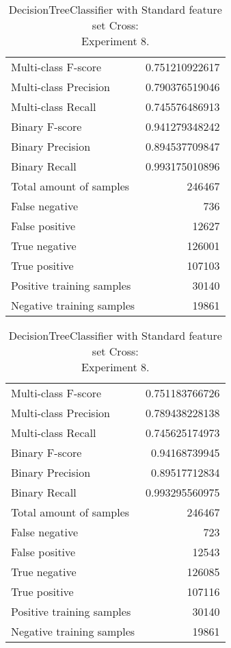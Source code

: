 \begin{table}[H]
\begin{minipage}{0.5\textwidth}
\caption{DecisionTreeClassifier with Standard feature set Cross: \\Experiment 7.}
\centering
\begin{tabular}{l r}
\toprule
Multi-class F-score & 0.751210922617 \\
Multi-class Precision & 0.790376519046 \\
Multi-class Recall & 0.745576486913 \\
\midrule
Binary F-score & 0.941279348242 \\
Binary Precision & 0.894537709847 \\
Binary Recall & 0.993175010896 \\
\midrule
Total amount of samples & 246467 \\
False negative & 736 \\
False positive & 12627 \\
True negative & 126001 \\
True positive & 107103 \\
\midrule
Positive training samples & 30140 \\
Negative training samples & 19861 \\
\bottomrule
\end{tabular}
\end{minipage}
\hfillx
\begin{minipage}{0.5\textwidth}
\caption{DecisionTreeClassifier with Standard feature set Cross: \\Experiment 8.}
\centering
\begin{tabular}{l r}
\toprule
Multi-class F-score & 0.751183766726 \\
Multi-class Precision & 0.789438228138 \\
Multi-class Recall & 0.745625174973 \\
\midrule
Binary F-score & 0.94168739945 \\
Binary Precision & 0.89517712834 \\
Binary Recall & 0.993295560975 \\
\midrule
Total amount of samples & 246467 \\
False negative & 723 \\
False positive & 12543 \\
True negative & 126085 \\
True positive & 107116 \\
\midrule
Positive training samples & 30140 \\
Negative training samples & 19861 \\
\bottomrule
\end{tabular}
\end{minipage}
\end{table}

